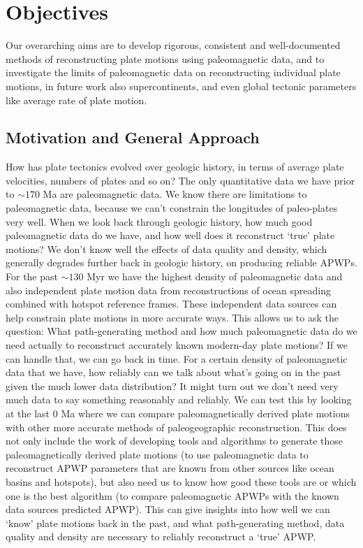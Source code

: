 \section{Objectives}

Our overarching aims are to develop rigorous, consistent and well-documented
methods of reconstructing plate motions using paleomagnetic data, and to
investigate the limits of paleomagnetic data on reconstructing individual plate
motions, in future work also supercontinents, and even global tectonic
parameters like average rate of plate motion.

\subsection{Motivation and General Approach}

How has plate tectonics evolved over geologic history, in terms of average plate
velocities, numbers of plates and so on? The only quantitative data we have
prior to ${\sim}170$ Ma are paleomagnetic data. We know there are limitations to
paleomagnetic data, because we can't constrain the longitudes of paleo-plates
very well. When we look back through geologic history, how much good
paleomagnetic data do we have, and how well does it reconstruct `true' plate
motions? We don't know well the effects of data quality and density, which
generally degrades further back in geologic history, on producing reliable
APWPs. For the past ${\sim}130$ Myr we have the highest density of
paleomagnetic data and also independent plate motion data from reconstructions
of ocean spreading combined with hotspot reference frames. These independent
data sources can help constrain plate motions in more accurate ways. This allows
us to ask the question: What path-generating method and how much paleomagnetic
data do we need actually to reconstruct accurately known modern-day plate
motions? If we can handle that, we can go back
in time. For a certain density of paleomagnetic data that we have, how reliably
can we talk about what's going on in the past given the much lower data
distribution? It might turn out we don't need very much data to say something
reasonably and reliably. We can test this by looking at the last 0
Ma where we can compare paleomagnetically derived plate motions with other more
accurate methods of paleogeographic reconstruction. This does not only include
the work of developing tools and algorithms to generate those paleomagnetically
derived plate motions (to use paleomagnetic data to reconstruct APWP parameters
that are known from other sources like ocean basins and hotspots), but also need
us to know how good these tools are or which one is the best algorithm (to
compare paleomagnetic APWPs with the known data sources predicted APWP). This
can give insights into how well we can `know' plate motions back in the past,
and what path-generating method, data quality and density are necessary to
reliably reconstruct a `true' APWP\@.

